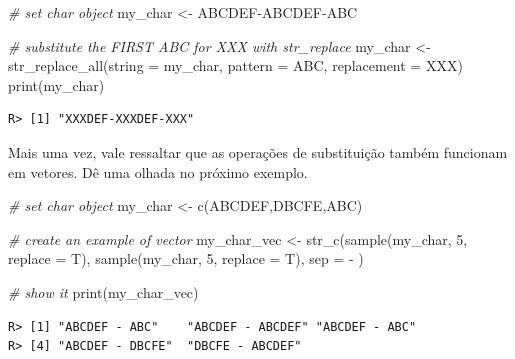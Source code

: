 \documentclass[
  11pt,
]{book}
\newenvironment{Shaded}{\begin{snugshade}}{\end{snugshade}}
\newcommand{\AttributeTok}[1]{\textcolor[rgb]{0.61,0.61,0.61}{#1}}
\newcommand{\CommentTok}[1]{\textcolor[rgb]{0.37,0.37,0.37}{\textit{#1}}}
\newcommand{\DecValTok}[1]{\textcolor[rgb]{0.06,0.06,0.06}{#1}}
\newcommand{\FunctionTok}[1]{\textcolor[rgb]{0,0,0}{#1}}
\newcommand{\NormalTok}[1]{#1}
\newcommand{\OtherTok}[1]{\textcolor[rgb]{0.37,0.37,0.37}{#1}}
\newcommand{\StringTok}[1]{\textcolor[rgb]{0.5,0.5,0.5}{#1}}
\begin{document}
\begin{Shaded}
\begin{Highlighting}[]
\CommentTok{\# set char object}
\NormalTok{my\_char }\OtherTok{\textless{}{-}} \StringTok{\textquotesingle{}ABCDEF{-}ABCDEF{-}ABC\textquotesingle{}}

\CommentTok{\# substitute the FIRST \textquotesingle{}ABC\textquotesingle{} for \textquotesingle{}XXX\textquotesingle{} with str\_replace}
\NormalTok{my\_char }\OtherTok{\textless{}{-}} \FunctionTok{str\_replace\_all}\NormalTok{(}\AttributeTok{string =}\NormalTok{ my\_char,}
                           \AttributeTok{pattern =} \StringTok{\textquotesingle{}ABC\textquotesingle{}}\NormalTok{,}
                           \AttributeTok{replacement =} \StringTok{\textquotesingle{}XXX\textquotesingle{}}\NormalTok{)}
\FunctionTok{print}\NormalTok{(my\_char)}
\end{Highlighting}
\end{Shaded}

\begin{verbatim}
R> [1] "XXXDEF-XXXDEF-XXX"
\end{verbatim}

Mais uma vez, vale ressaltar que as operações de substituição também funcionam em vetores. Dê uma olhada no próximo exemplo.

\begin{Shaded}
\begin{Highlighting}[]
\CommentTok{\# set char object}
\NormalTok{my\_char }\OtherTok{\textless{}{-}} \FunctionTok{c}\NormalTok{(}\StringTok{\textquotesingle{}ABCDEF\textquotesingle{}}\NormalTok{,}\StringTok{\textquotesingle{}DBCFE\textquotesingle{}}\NormalTok{,}\StringTok{\textquotesingle{}ABC\textquotesingle{}}\NormalTok{)}

\CommentTok{\# create an example of vector}
\NormalTok{my\_char\_vec }\OtherTok{\textless{}{-}} \FunctionTok{str\_c}\NormalTok{(}\FunctionTok{sample}\NormalTok{(my\_char, }\DecValTok{5}\NormalTok{, }\AttributeTok{replace =}\NormalTok{ T),}
                     \FunctionTok{sample}\NormalTok{(my\_char, }\DecValTok{5}\NormalTok{, }\AttributeTok{replace =}\NormalTok{ T),}
                     \AttributeTok{sep =} \StringTok{\textquotesingle{} {-} \textquotesingle{}}\NormalTok{)}

\CommentTok{\# show it}
\FunctionTok{print}\NormalTok{(my\_char\_vec)}
\end{Highlighting}
\end{Shaded}

\begin{verbatim}
R> [1] "ABCDEF - ABC"    "ABCDEF - ABCDEF" "ABCDEF - ABC"   
R> [4] "ABCDEF - DBCFE"  "DBCFE - ABCDEF"
\end{verbatim}
\end{document}
